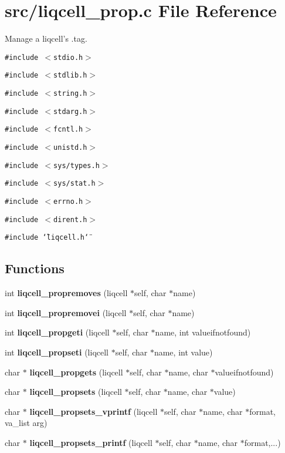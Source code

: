 \section{src/liqcell\_\-prop.c File Reference}
\label{d7/db4/liqcell__prop_8c}
Manage a liqcell's .tag.  


{\tt \#include $<$stdio.h$>$}\par
{\tt \#include $<$stdlib.h$>$}\par
{\tt \#include $<$string.h$>$}\par
{\tt \#include $<$stdarg.h$>$}\par
{\tt \#include $<$fcntl.h$>$}\par
{\tt \#include $<$unistd.h$>$}\par
{\tt \#include $<$sys/types.h$>$}\par
{\tt \#include $<$sys/stat.h$>$}\par
{\tt \#include $<$errno.h$>$}\par
{\tt \#include $<$dirent.h$>$}\par
{\tt \#include \char`\"{}liqcell.h\char`\"{}}\par
\subsection*{Functions}
\begin{CompactItemize}
\item 
int {\bf liqcell\_\-propremoves} (liqcell $\ast$self, char $\ast$name)
\item 
int {\bf liqcell\_\-propremovei} (liqcell $\ast$self, char $\ast$name)
\item 
int {\bf liqcell\_\-propgeti} (liqcell $\ast$self, char $\ast$name, int valueifnotfound)
\item 
int {\bf liqcell\_\-propseti} (liqcell $\ast$self, char $\ast$name, int value)
\item 
char $\ast$ {\bf liqcell\_\-propgets} (liqcell $\ast$self, char $\ast$name, char $\ast$valueifnotfound)
\item 
char $\ast$ {\bf liqcell\_\-propsets} (liqcell $\ast$self, char $\ast$name, char $\ast$value)
\item 
char $\ast$ {\bf liqcell\_\-propsets\_\-vprintf} (liqcell $\ast$self, char $\ast$name, char $\ast$format, va\_\-list arg)
\item 
char $\ast$ {\bf liqcell\_\-propsets\_\-printf} (liqcell $\ast$self, char $\ast$name, char $\ast$format,...)
\end{CompactItemize}


